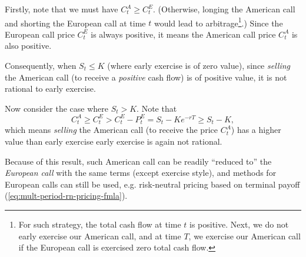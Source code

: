 \begin{enumerate}
\begin{pf}
Firstly, note that we must have \(C_t^A\ge C_t^E\). (Otherwise, longing the
American call and shorting the European call at time \(t\) would lead to
arbitrage\footnote{For such strategy, the total cash flow at time \(t\) is
positive. Next, we do not early exercise our American call, and at time \(T\),
we exercise our American call if the European call is exercised
 zero total cash flow.}.) Since the European call price
\(C_t^E\) is always positive, it means the American call price \(C_t^A\) is
also positive.

Consequently, when \(S_t\le K\) (where early exercise is of zero value), since
\emph{selling} the American call (to receive a \emph{positive} cash flow) is of
positive value, it is not rational to early exercise.

Now consider the case where \(S_t>K\). Note that
\[
C_t^{A}\ge C_t^{E}>C_t^{E}-P_t^{E}=S_t-Ke^{-rT}\ge S_t-K,
\]
which means \emph{selling} the American call (to receive the price \(C_t^A\))
has a higher value than early exercise  early exercise is
again not rational.
\end{pf}

\begin{note}
Because of this result, such American call can be readily ``reduced to'' the
\emph{European call} with the same terms (except exercise style), and methods
for European calls can still be used, e.g. risk-neutral pricing based on
terminal payoff (\cref{eq:mult-period-rn-pricing-fmla}).
\end{note}
\end{enumerate}
